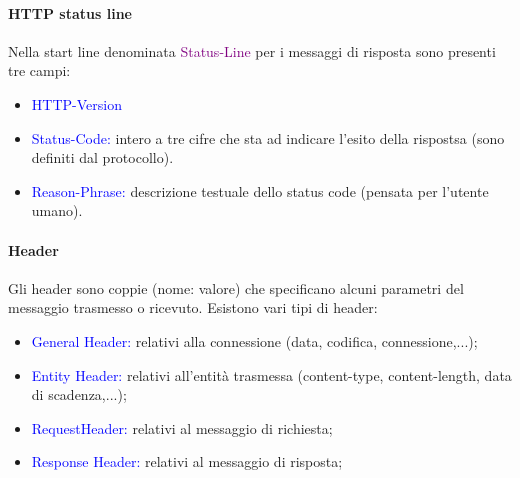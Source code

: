\paragraph{HTTP status line} Nella start line denominata \textcolor{purple}{Status-Line} per i messaggi di risposta sono presenti tre campi:
\begin{itemize}
    \item \textcolor{blue}{HTTP-Version}
    \item \textcolor{blue}{Status-Code:} intero a tre cifre che sta ad indicare l'esito della rispostsa (sono definiti dal protocollo).
    \item \textcolor{blue}{Reason-Phrase:} descrizione testuale dello status code (pensata per l’utente umano). 
\end{itemize}

\paragraph{Header}
Gli header sono coppie (nome: valore) che specificano alcuni parametri del messaggio trasmesso o ricevuto. Esistono vari tipi di header:
\begin{itemize}
    \item \textcolor{blue}{General Header:} relativi alla connessione (data, codifica, connessione,...);
    \item \textcolor{blue}{Entity Header:} relativi all’entità trasmessa (content-type, content-length, data di scadenza,...);
    \item \textcolor{blue}{RequestHeader:} relativi al messaggio di richiesta;
    \item \textcolor{blue}{Response Header:} relativi al messaggio di risposta;
\end{itemize}
\newblock
